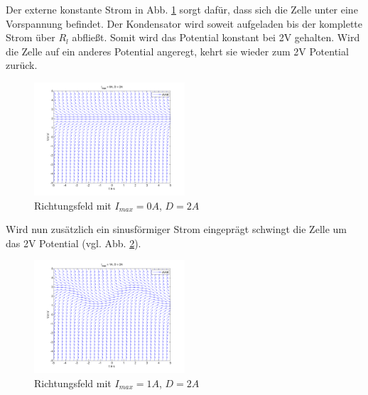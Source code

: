\documentclass[conference]{IEEEtran}
\begin{document}
Der externe konstante Strom in Abb. \ref{fig:slope3} sorgt dafür, dass sich die Zelle unter eine Vorspannung befindet. Der Kondensator wird soweit aufgeladen bis der komplette Strom über $R_l$ abfließt. Somit wird das Potential konstant bei 2V gehalten. Wird die Zelle auf ein anderes Potential angeregt, kehrt sie wieder zum 2V Potential zurück.\\
\begin{figure}[h!]
	\centering
	\includegraphics[width=0.5\textwidth]{img/slopefield3.png}
	\caption{Richtungsfeld mit $I_{max}=0A$, $D=2A$}
	\label{fig:slope3}
\end{figure}

Wird nun zusätzlich ein sinusförmiger Strom eingeprägt schwingt die Zelle um das 2V Potential (vgl. Abb. \ref{fig:slope4}).
\begin{figure}[h!]
	\centering
	\includegraphics[width=0.5\textwidth]{img/slopefield4.png}
	\caption{Richtungsfeld mit $I_{max}=1A$, $D=2A$}
	\label{fig:slope4}
\end{figure}
\end{document}
